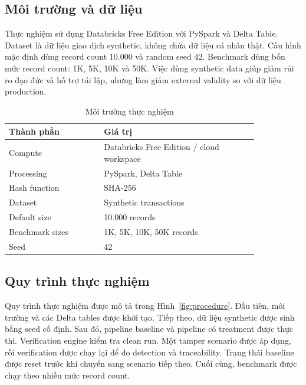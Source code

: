 \subsection{Môi trường và dữ liệu}

Thực nghiệm sử dụng Databricks Free Edition với PySpark và Delta Table. Dataset là dữ liệu giao dịch synthetic, không chứa dữ liệu cá nhân thật. Cấu hình mặc định dùng record count 10.000 và random seed 42. Benchmark dùng bốn mức record count: 1K, 5K, 10K và 50K. Việc dùng synthetic data giúp giảm rủi ro đạo đức và hỗ trợ tái lập, nhưng làm giảm external validity so với dữ liệu production.

\begin{table}[t]
\caption{Môi trường thực nghiệm}
\centering
\begin{tabular}{p{0.32\linewidth}p{0.52\linewidth}}
\toprule
\textbf{Thành phần} & \textbf{Giá trị} \\
\midrule
Compute & Databricks Free Edition / cloud workspace \\
Processing & PySpark, Delta Table \\
Hash function & SHA-256 \\
Dataset & Synthetic transactions \\
Default size & 10.000 records \\
Benchmark sizes & 1K, 5K, 10K, 50K records \\
Seed & 42 \\
\bottomrule
\end{tabular}
\label{tab:environment}
\end{table}

\subsection{Quy trình thực nghiệm}

Quy trình thực nghiệm được mô tả trong Hình~\ref{fig:procedure}. Đầu tiên, môi trường và các Delta tables được khởi tạo. Tiếp theo, dữ liệu synthetic được sinh bằng seed cố định. Sau đó, pipeline baseline và pipeline có treatment được thực thi. Verification engine kiểm tra clean run. Một tamper scenario được áp dụng, rồi verification được chạy lại để đo detection và traceability. Trạng thái baseline được reset trước khi chuyển sang scenario tiếp theo. Cuối cùng, benchmark được chạy theo nhiều mức record count.

